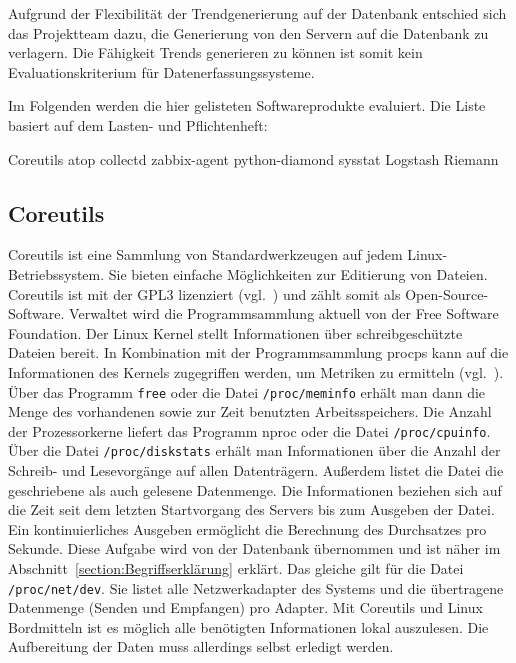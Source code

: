 Aufgrund der Flexibilität der Trendgenerierung auf der Datenbank entschied sich
das Projektteam dazu, die Generierung von den Servern auf die Datenbank zu
verlagern. Die Fähigkeit Trends generieren zu können ist somit kein
Evaluationskriterium für Datenerfassungssysteme.

Im Folgenden werden die hier gelisteten Softwareprodukte evaluiert. Die Liste
basiert auf dem Lasten- und Pflichtenheft:

\begin{outline}
  \1 Coreutils
  \1 atop
  \1 collectd
  \1 zabbix\hyp{}agent
  \1 python\hyp{}diamond
  \1 sysstat
  \1 Logstash
  \1 Riemann
\end{outline}
\tm%

\subsection{Coreutils}
Coreutils ist eine Sammlung von Standardwerkzeugen auf jedem
Linux\hyp{}Betriebssystem. Sie bieten einfache Möglichkeiten zur Editierung von
Dateien. Coreutils ist mit der GPL3 lizenziert (vgl.~\cite{coreutils}) und
zählt somit als Open\hyp{}Source\hyp{}Software. Verwaltet wird die
Programmsammlung aktuell von der Free Software Foundation. Der Linux Kernel
stellt Informationen über schreibgeschützte Dateien bereit. In Kombination mit
der Programmsammlung procps kann auf die Informationen des Kernels zugegriffen
werden, um Metriken zu ermitteln (vgl.~\cite{procps}). Über das Programm
\texttt{free} oder die Datei \texttt{/proc/meminfo} erhält man dann die Menge
des vorhandenen sowie zur Zeit benutzten Arbeitsspeichers. Die Anzahl der
Prozessorkerne liefert das Programm nproc oder die Datei
\texttt{/proc/cpuinfo}. Über die Datei \texttt{/proc/diskstats} erhält man
Informationen über die Anzahl der Schreib- und Lesevorgänge auf allen
Datenträgern. Außerdem listet die Datei die geschriebene als auch gelesene
Datenmenge. Die Informationen beziehen sich auf die Zeit seit dem letzten
Startvorgang des Servers bis zum Ausgeben der Datei. Ein kontinuierliches
Ausgeben ermöglicht die Berechnung des Durchsatzes pro Sekunde. Diese Aufgabe
wird von der Datenbank übernommen und ist näher im
Abschnitt~\ref{section:Begriffserklärung} erklärt. Das gleiche gilt für die
Datei \texttt{/proc/net/dev}. Sie listet alle Netzwerkadapter des Systems und
die übertragene Datenmenge (Senden und Empfangen) pro Adapter. Mit Coreutils
und Linux Bordmitteln ist es möglich alle benötigten Informationen lokal
auszulesen. Die Aufbereitung der Daten muss allerdings selbst erledigt werden.

